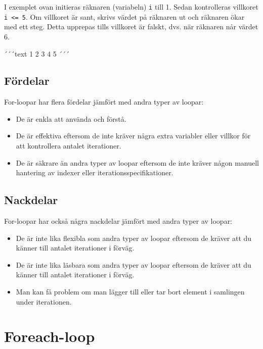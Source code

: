I exemplet ovan initieras räknaren (variabeln) \texttt{i} till 1. Sedan
kontrolleras villkoret \texttt{i\ \textless{}=\ 5}. Om villkoret är
sant, skrivs värdet på räknaren ut och räknaren ökar med ett steg. Detta
upprepas tills villkoret är falskt, dvs. när räknaren når värdet 6.

´´´text 1 2 3 4 5 ´´´

\hypertarget{fuxf6rdelar}{%
\subsection{Fördelar}\label{fuxf6rdelar}}

For-loopar har flera fördelar jämfört med andra typer av loopar:

\begin{itemize}
\tightlist
\item
  De är enkla att använda och förstå.
\item
  De är effektiva eftersom de inte kräver några extra variabler eller
  villkor för att kontrollera antalet iterationer.
\item
  De är säkrare än andra typer av loopar eftersom de inte kräver någon
  manuell hantering av indexer eller iterationsspecifikationer.
\end{itemize}

\hypertarget{nackdelar}{%
\subsection{Nackdelar}\label{nackdelar}}

For-loopar har också några nackdelar jämfört med andra typer av loopar:

\begin{itemize}
\tightlist
\item
  De är inte lika flexibla som andra typer av loopar eftersom de kräver
  att du känner till antalet iterationer i förväg.
\item
  De är inte lika läsbara som andra typer av loopar eftersom de kräver
  att du känner till antalet iterationer i förväg.
\item
  Man kan få problem om man lägger till eller tar bort element i
  samlingen under iterationen.
\end{itemize}

\hypertarget{foreach-loop}{%
\section{Foreach-loop}\label{foreach-loop}}

